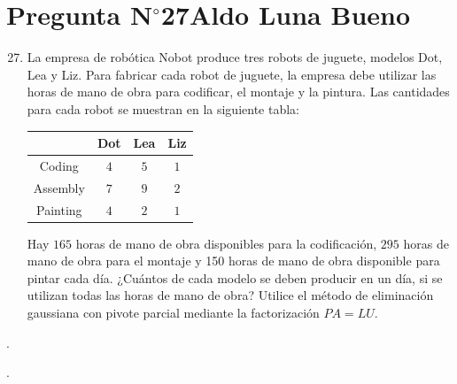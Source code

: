 \section{Pregunta N$^{\circ}$27\qquad Aldo Luna Bueno}

\begin{frame}
	\begin{enumerate}\setcounter{enumi}{26}
		\item

		      La empresa de robótica Nobot produce tres robots de
		      juguete, modelos Dot, Lea y Liz.
		      Para fabricar cada robot de juguete, la empresa debe
		      utilizar las horas de mano de obra para codificar, el
		      montaje y la pintura.
		      Las cantidades para cada robot se muestran en la siguiente
		      tabla:

		      \begin{table}[ht!]
			      \centering
			      \begin{tabular}{c|c|c|c}
				      \hline
				               & Dot & Lea & Liz \\
				      \hline
				      Coding   & $4$ & $5$ & $1$ \\
				      Assembly & $7$ & $9$ & $2$ \\
				      Painting & $4$ & $2$ & $1$ \\
				      \hline
			      \end{tabular}
		      \end{table}

		      Hay $165$ horas de mano de obra disponibles para la
		      codificación, $295$ horas de mano de obra para el montaje
		      y 150 horas de mano de obra disponible para pintar cada
		      día.
		      ¿Cuántos de cada modelo se deben producir en un día, si se
		      utilizan todas las horas de mano de obra?
		      Utilice el método de eliminación gaussiana con pivote
		      parcial mediante la factorización $PA=LU$.
	\end{enumerate}

	\begin{solution}
		.
	\end{solution}
\end{frame}

\begin{frame}
	\begin{solution}
		.
	\end{solution}
\end{frame}
